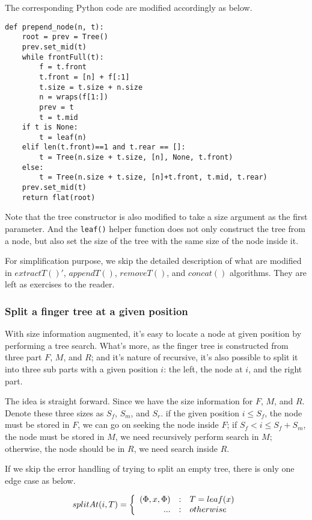 \documentclass[UTF8]{article}
\begin{document}
The corresponding Python code are modified accordingly as below.

\lstset{language=Python}
\begin{lstlisting}
def prepend_node(n, t):
    root = prev = Tree()
    prev.set_mid(t)
    while frontFull(t):
        f = t.front
        t.front = [n] + f[:1]
        t.size = t.size + n.size
        n = wraps(f[1:])
        prev = t
        t = t.mid
    if t is None:
        t = leaf(n)
    elif len(t.front)==1 and t.rear == []:
        t = Tree(n.size + t.size, [n], None, t.front)
    else:
        t = Tree(n.size + t.size, [n]+t.front, t.mid, t.rear)
    prev.set_mid(t)
    return flat(root)
\end{lstlisting}

Note that the tree constructor is also modified to take a size argument
as the first parameter. And the \verb|leaf()| helper function does not
only construct the tree from a node, but also set the size of the tree
with the same size of the node inside it.

For simplification purpose, we skip the detailed description of what are modified in
$extractT()'$, $appendT()$, $removeT()$, and $concat()$ algorithms. They are left as exercises to the
reader.

\subsubsection{Split a finger tree at a given position}

With size information augmented, it's easy to locate a node at given position by performing
a tree search. What's more, as the finger tree is constructed from three part $F$, $M$, and
$R$; and it's nature of recursive, it's also possible to split it into three sub parts with
a given position $i$: the left, the node at $i$, and the right part.

The idea is straight forward. Since we have the size information for $F$, $M$, and $R$. Denote
these three sizes as $S_f$, $S_m$, and $S_r$. if the given position $i \leq S_f$, the node must
be stored in $F$, we can go on seeking the node inside $F$; if $S_f < i \leq S_f + S_m $, the
node must be stored in $M$, we need recursively perform search in $M$; otherwise, the node
should be in $R$, we need search inside $R$.

If we skip the error handling of trying to split an empty tree, there is only one edge case
as below.

\[
splitAt(i, T) = \left \{
  \begin{array}
  {r@{\quad:\quad}l}
  (\Phi, x, \Phi) & T = leaf(x) \\
  ... & otherwise
  \end{array}
\right .
\]
\end{document}
